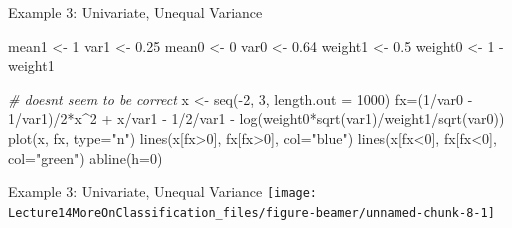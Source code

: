 \documentclass[
  ignorenonframetext,
]{beamer}
\newenvironment{Shaded}{\begin{snugshade}}{\end{snugshade}}
\newcommand{\AttributeTok}[1]{\textcolor[rgb]{0.77,0.63,0.00}{#1}}
\newcommand{\CommentTok}[1]{\textcolor[rgb]{0.56,0.35,0.01}{\textit{#1}}}
\newcommand{\DecValTok}[1]{\textcolor[rgb]{0.00,0.00,0.81}{#1}}
\newcommand{\FloatTok}[1]{\textcolor[rgb]{0.00,0.00,0.81}{#1}}
\newcommand{\FunctionTok}[1]{\textcolor[rgb]{0.00,0.00,0.00}{#1}}
\newcommand{\NormalTok}[1]{#1}
\newcommand{\OtherTok}[1]{\textcolor[rgb]{0.56,0.35,0.01}{#1}}
\newcommand{\SpecialCharTok}[1]{\textcolor[rgb]{0.00,0.00,0.00}{#1}}
\newcommand{\StringTok}[1]{\textcolor[rgb]{0.31,0.60,0.02}{#1}}
\begin{document}
\begin{frame}[fragile]{Example 3: Univariate, Unequal Variance}
\protect\hypertarget{example-3-univariate-unequal-variance-2}{}
\tiny

\begin{Shaded}
\begin{Highlighting}[]
\NormalTok{mean1 }\OtherTok{\textless{}{-}} \DecValTok{1}
\NormalTok{var1 }\OtherTok{\textless{}{-}} \FloatTok{0.25}
\NormalTok{mean0 }\OtherTok{\textless{}{-}} \DecValTok{0}
\NormalTok{var0 }\OtherTok{\textless{}{-}} \FloatTok{0.64}
\NormalTok{weight1 }\OtherTok{\textless{}{-}} \FloatTok{0.5}
\NormalTok{weight0 }\OtherTok{\textless{}{-}} \DecValTok{1} \SpecialCharTok{{-}}\NormalTok{ weight1}

\CommentTok{\# doesn\textquotesingle{}t seem to be correct}
\NormalTok{x }\OtherTok{\textless{}{-}} \FunctionTok{seq}\NormalTok{(}\SpecialCharTok{{-}}\DecValTok{2}\NormalTok{, }\DecValTok{3}\NormalTok{, }\AttributeTok{length.out =} \DecValTok{1000}\NormalTok{)}
\NormalTok{fx}\OtherTok{=}\NormalTok{(}\DecValTok{1}\SpecialCharTok{/}\NormalTok{var0 }\SpecialCharTok{{-}} \DecValTok{1}\SpecialCharTok{/}\NormalTok{var1)}\SpecialCharTok{/}\DecValTok{2}\SpecialCharTok{*}\NormalTok{x}\SpecialCharTok{\^{}}\DecValTok{2} \SpecialCharTok{+}\NormalTok{ x}\SpecialCharTok{/}\NormalTok{var1 }\SpecialCharTok{{-}} \DecValTok{1}\SpecialCharTok{/}\DecValTok{2}\SpecialCharTok{/}\NormalTok{var1 }\SpecialCharTok{{-}} \FunctionTok{log}\NormalTok{(weight0}\SpecialCharTok{*}\FunctionTok{sqrt}\NormalTok{(var1)}\SpecialCharTok{/}\NormalTok{weight1}\SpecialCharTok{/}\FunctionTok{sqrt}\NormalTok{(var0))}
\FunctionTok{plot}\NormalTok{(x, fx, }\AttributeTok{type=}\StringTok{"n"}\NormalTok{)}
\FunctionTok{lines}\NormalTok{(x[fx}\SpecialCharTok{\textgreater{}}\DecValTok{0}\NormalTok{], fx[fx}\SpecialCharTok{\textgreater{}}\DecValTok{0}\NormalTok{], }\AttributeTok{col=}\StringTok{"blue"}\NormalTok{)}
\FunctionTok{lines}\NormalTok{(x[fx}\SpecialCharTok{\textless{}}\DecValTok{0}\NormalTok{], fx[fx}\SpecialCharTok{\textless{}}\DecValTok{0}\NormalTok{], }\AttributeTok{col=}\StringTok{"green"}\NormalTok{)}
\FunctionTok{abline}\NormalTok{(}\AttributeTok{h=}\DecValTok{0}\NormalTok{)}
\end{Highlighting}
\end{Shaded}

\normalsize
\end{frame}

\begin{frame}{Example 3: Univariate, Unequal Variance}
\protect\hypertarget{example-3-univariate-unequal-variance-3}{}
\texttt{[image: Lecture14MoreOnClassification\_files/figure-beamer/unnamed-chunk-8-1]}
\end{frame}
\end{document}
